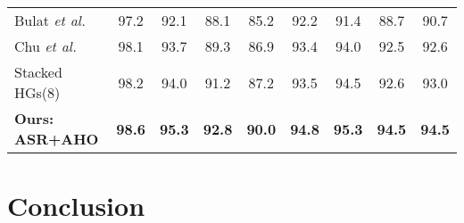 \documentclass[10pt,twocolumn,letterpaper]{article}
\begin{document}
\begin{table}[htb]
\begin{center}
\begin{tabular}{@{}lcccccccc@{}}
Bulat \textit{et al.}\cite{bulat2016human}& 97.2 & 92.1 & 88.1 & 85.2 & 92.2 & 91.4 & 88.7 & 90.7\\
Chu \textit{et al.}\cite{chu2017multi}& 98.1 & 93.7 & 89.3 & 86.9 &  93.4 & 94.0 & 92.5 & 92.6\\
\hline
Stacked HGs(8) \cite{newell2016stacked} & 98.2 & 94.0 & 91.2 & 87.2 & 93.5 & 94.5 & 92.6 & 93.0\\
\textbf{Ours: ASR+AHO} & \textbf{98.6} & \textbf{95.3} & \textbf{92.8} & \textbf{90.0} & \textbf{94.8} & \textbf{95.3} & \textbf{94.5} & \textbf{94.5}\\
\bottomrule
\end{tabular}
\end{center}
\vspace{-10pt}
\end{table}%
\vspace{-0.1in}\section{Conclusion}%
\end{document}
